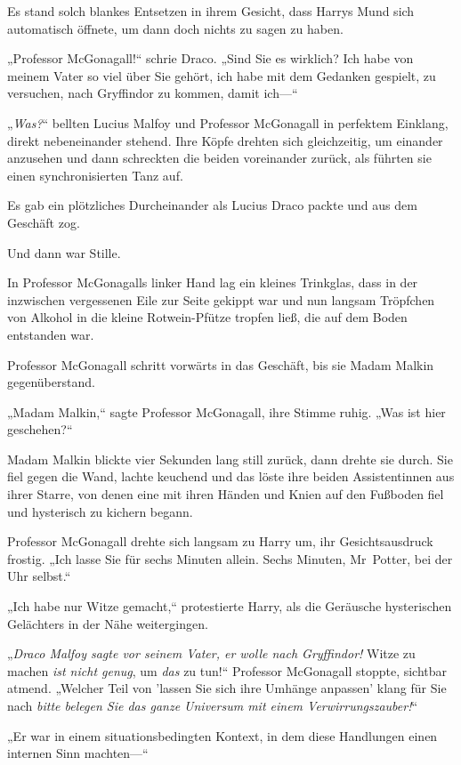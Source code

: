 {Es stand solch blankes Entsetzen in ihrem Gesicht, dass Harrys Mund sich automatisch öffnete, um dann doch nichts zu sagen zu haben.

„Professor McGonagall!“ schrie Draco. „Sind Sie es wirklich? Ich habe von meinem Vater so viel über Sie gehört, ich habe mit dem Gedanken gespielt, zu versuchen, nach Gryffindor zu kommen, damit ich—“

„\emph{Was?}“ bellten Lucius Malfoy und Professor McGonagall in perfektem Einklang, direkt nebeneinander stehend. Ihre Köpfe drehten sich gleichzeitig, um einander anzusehen und dann schreckten die beiden voreinander zurück, als führten sie einen synchronisierten Tanz auf.

Es gab ein plötzliches Durcheinander als Lucius Draco packte und aus dem Geschäft zog.

Und dann war Stille.

In Professor McGonagalls linker Hand lag ein kleines Trinkglas, dass in der inzwischen vergessenen Eile zur Seite gekippt war und nun langsam Tröpfchen von Alkohol in die kleine Rotwein-Pfütze tropfen ließ, die auf dem Boden entstanden war.

Professor McGonagall schritt vorwärts in das Geschäft, bis sie Madam Malkin gegenüberstand.

„Madam Malkin,“ sagte Professor McGonagall, ihre Stimme ruhig. „Was ist hier geschehen?“

Madam Malkin blickte vier Sekunden lang still zurück, dann drehte sie durch. Sie fiel gegen die Wand, lachte keuchend und das löste ihre beiden Assistentinnen aus ihrer Starre, von denen eine mit ihren Händen und Knien auf den Fußboden fiel und hysterisch zu kichern begann.

Professor McGonagall drehte sich langsam zu Harry um, ihr Gesichtsausdruck frostig. „Ich lasse Sie für sechs Minuten allein. Sechs Minuten, Mr~Potter, bei der Uhr selbst.“

„Ich habe nur Witze gemacht,“ protestierte Harry, als die Geräusche hysterischen Gelächters in der Nähe weitergingen.

„\emph{Draco Malfoy sagte vor seinem Vater, er wolle nach Gryffindor!} Witze zu machen \emph{ist nicht genug}, um \emph{das} zu tun!“ Professor McGonagall stoppte, sichtbar atmend. „Welcher Teil von 'lassen Sie sich ihre Umhänge anpassen' klang für Sie nach \emph{bitte belegen Sie das ganze Universum mit einem Verwirrungszauber!}“

„Er war in einem situationsbedingten Kontext, in dem diese Handlungen einen internen Sinn machten—“

}
